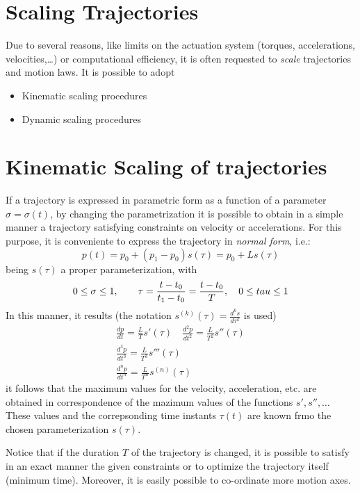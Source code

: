 \documentclass{book}
\begin{document}
\section{Scaling Trajectories}
Due to several reasons, like limits on the actuation system (torques, accelerations, velocities,\dots) or computational efficiency, it is often requested to \emph{scale} trajectories and motion laws. It is possible to adopt 
\begin{itemize}
  \item Kinematic scaling procedures
  \item Dynamic scaling procedures
\end{itemize}

\section{Kinematic Scaling of trajectories}
If a trajectory is expressed in parametric form as a function of a parameter $\sigma=\sigma(t)$, by changing the parametrization it is possible to obtain in a simple manner a trajectory satisfying constraints on velocity or accelerations. 
For this purpose, it is conveniente to express the trajectory in \emph{normal form}, i.e.: 
\[
    p(t)=p_0+(p_1-p_0)s(\tau)=p_0+Ls(\tau)
\]
being $s(\tau)$ a proper parameterization, with 
\[
    0\leq\sigma\leq 1, \qquad \tau=\displaystyle\frac{t-t_0}{t_1-t_0}=\displaystyle\frac{t-t_0}{T},\quad 0\leq\\tau\leq 1
\]
In this manner, it results (the notation $s^{(k)}(\tau) = \displaystyle\frac{d^ks}{d\tau^k}$ is used) 
\begin{gather*}
    \displaystyle\frac{dp}{dt}= \displaystyle\frac{L}{T}s'(\tau) \quad \displaystyle\frac{d^2p}{dt^2}=\displaystyle\frac{L}{T^2}s''(\tau) \\
    \displaystyle\frac{d^3p}{dt^3}=\displaystyle\frac{L}{T^3}s'''(\tau)\\
    \displaystyle\frac{d^np}{dt^n}=\displaystyle\frac{L}{T^n}s^{(n)}(\tau)
\end{gather*}
it follows that the maximum values for the velocity, acceleration, etc. are obtained in correspondence of the mazimum values of the functions $s',s'',\dots$
These values and the correpsonding time instants $\tau(t)$ are known frmo the chosen parameterization $s(\tau)$. 

Notice that if the duration $T$ of the trajectory is changed, it is possible to satisfy in an exact manner the given constraints or to optimize the trajectory itself (minimum time). Moreover, it is easily possible to co-ordinate more motion axes. 
\end{document}
